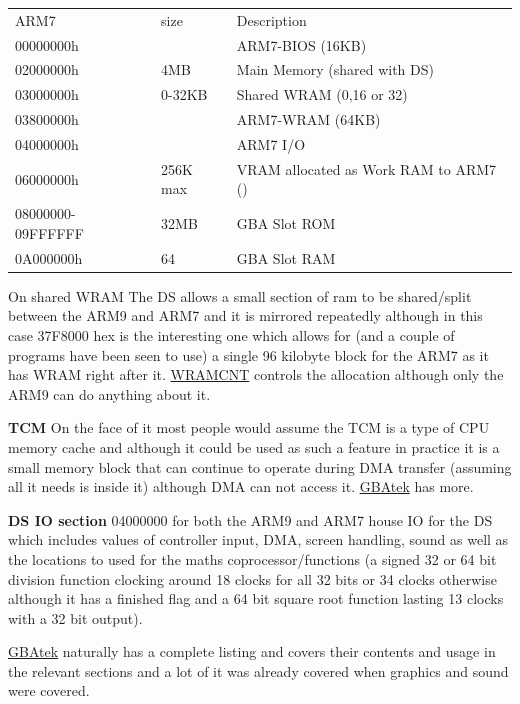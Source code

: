 \documentclass[
]{book}
\begin{document}
\begin{longtable}[]{@{}lll@{}}
\toprule()
\endhead
ARM7 & size & Description \\
00000000h & & ARM7-BIOS (16KB) \\
02000000h & 4MB & Main Memory (shared with DS) \\
03000000h & 0-32KB & Shared WRAM (0,16 or 32) \\
03800000h & & ARM7-WRAM (64KB) \\
04000000h & & ARM7 I/O \\
06000000h & 256K max & VRAM allocated as Work RAM to ARM7 () \\
08000000- 09FFFFFF & 32MB & GBA Slot ROM \\
0A000000h & 64 & GBA Slot RAM \\
\bottomrule()
\end{longtable}

On shared WRAM The DS allows a small section of ram to be shared/split between the ARM9 and ARM7 and it is mirrored repeatedly although in this case 37F8000 hex is the interesting one which allows for (and a couple of programs have been seen to use) a single 96 kilobyte block for the ARM7 as it has WRAM right after it. \href{http://problemkaputt.de/gbatek.htm\#dsmemorycontrolwram}{WRAMCNT} controls the allocation although only the ARM9 can do anything about it.

\textbf{TCM} On the face of it most people would assume the TCM is a type of CPU memory cache and although it could be used as such a feature in practice it is a small memory block that can continue to operate during DMA transfer (assuming all it needs is inside it) although DMA can not access it. \href{http://problemkaputt.de/gbatek.htm\#armcp15tightlycoupledmemorytcm}{GBAtek} has more.

\textbf{DS IO section} 04000000 for both the ARM9 and ARM7 house IO for the DS which includes values of controller input, DMA, screen handling, sound as well as the locations to used for the maths coprocessor/functions (a signed 32 or 64 bit division function clocking around 18 clocks for all 32 bits or 34 clocks otherwise although it has a finished flag and a 64 bit square root function lasting 13 clocks with a 32 bit output).

\href{http://problemkaputt.de/gbatek.htm\#dsiomaps}{GBAtek} naturally has a complete listing and covers their contents and usage in the relevant sections and a lot of it was already covered when graphics and sound were covered.
\end{document}

